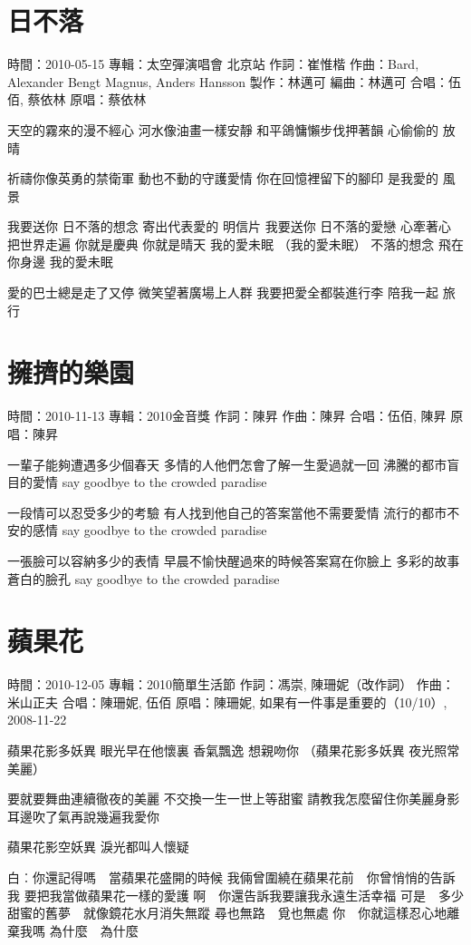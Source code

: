 \documentclass[UTF8,a4paper,oneside,twocolumn,12pt]{ctexbook}
\newcommand{\infopair}[2]{\textbullet #1：#2}
\newcommand{\zc}[1][伍佰]{\infopair{作詞}{#1}}
\newcommand{\zq}[1][伍佰]{\infopair{作曲}{#1}}
\newcommand{\bq}[1][伍佰]{\infopair{編曲}{#1}}
\newcommand{\zj}[1]{\infopair{專輯}{#1}}
\newcommand{\zz}[1]{\infopair{製作}{#1}}
\newcommand{\yc}[1]{\infopair{原唱}{#1}}
\newcommand{\sj}[1]{\infopair{時間}{#1}}
\newenvironment{info}{\begin{flushleft}\kaishu
	}
	{\end{flushleft}\normalsize\yahei\par}
\newenvironment{lyric}{
	}
{}
\begin{document}
\section{日不落}
\begin{info}
	\sj{2010-05-15}
	\zj{太空彈演唱會 北京站}
	\zc[崔惟楷]
	\zq[Bard, Alexander Bengt Magnus, Anders Hansson]
	\zz{林邁可}
	\bq[林邁可]
	\infopair{合唱}{伍佰, 蔡依林}
	\yc{蔡依林}
\end{info}
\begin{lyric}
	天空的霧來的漫不經心
	河水像油畫一樣安靜
	和平鴿慵懶步伐押著韻
	心偷偷的 放晴

	祈禱你像英勇的禁衛軍
	動也不動的守護愛情
	你在回憶裡留下的腳印
	是我愛的 風景

	我要送你 日不落的想念
	寄出代表愛的 明信片
	我要送你 日不落的愛戀
	心牽著心 把世界走遍
	你就是慶典 你就是晴天 我的愛未眠 （我的愛未眠）
	不落的想念 飛在你身邊 我的愛未眠

	愛的巴士總是走了又停
	微笑望著廣場上人群
	我要把愛全都裝進行李
	陪我一起 旅行
\end{lyric}

\section{擁擠的樂園}%
\begin{info}
	\sj{2010-11-13}
	\zj{2010金音獎}
	\zc[陳昇]
	\zq[陳昇]
	\infopair{合唱}{伍佰, 陳昇}
	\yc{陳昇}
\end{info}
\begin{lyric}
	一輩子能夠遭遇多少個春天
	多情的人他們怎會了解一生愛過就一回
	沸騰的都市盲目的愛情
	say goodbye to the crowded paradise

	一段情可以忍受多少的考驗
	有人找到他自己的答案當他不需要愛情
	流行的都市不安的感情
	say goodbye to the crowded paradise

	一張臉可以容納多少的表情
	早晨不愉快醒過來的時候答案寫在你臉上
	多彩的故事蒼白的臉孔
	say goodbye to the crowded paradise
\end{lyric}

\section{蘋果花}
\begin{info}
	\sj{2010-12-05}
	\zj{2010簡單生活節}
	\zc[馮崇, 陳珊妮（改作詞）]
	\zq[米山正夫]
	\infopair{合唱}{陳珊妮, 伍佰}
	\yc{陳珊妮, 如果有一件事是重要的（10/10）, 2008-11-22}
\end{info}
\begin{lyric}
	蘋果花影多妖異 眼光早在他懷裏
	香氣飄逸 想親吻你
	（蘋果花影多妖異 夜光照常美麗）

	要就要舞曲連續徹夜的美麗
	不交換一生一世上等甜蜜
	請教我怎麼留住你美麗身影
	耳邊吹了氣再說幾遍我愛你

	蘋果花影空妖異 淚光都叫人懷疑

	白︰你還記得嗎　當蘋果花盛開的時候
	我倆曾圍繞在蘋果花前　你曾悄悄的告訴我
	要把我當做蘋果花一樣的愛護
	啊　你還告訴我要讓我永遠生活幸福
	可是　多少甜蜜的舊夢　就像鏡花水月消失無蹤
	尋也無路　覓也無處
	你　你就這樣忍心地離棄我嗎
	為什麼　為什麼
\end{lyric}
\end{document}
